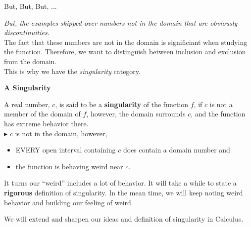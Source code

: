 \documentclass{ximera}
\begin{document}
\begin{observation} But, But, But, ...

\textit{But, the examples skipped over numbers not in the domain that are obviously discontinuities.}  \\

The fact that these numbers are not in the domain is significiant when studying the function.  Therefore, we want to distinguish between inclusion and exclusion from the domain. \\

This is why we have the \textit{singularity} category.
\end{observation}










\begin{idea} \textbf{\textcolor{green!50!black}{A Singularity}}  

A real number, $c$, is said to be a \textbf{singularity} of the function $f$, if $c$ is not a member of the domain of $f$, however, the domain surrounds $c$, and the function has extreme behavior there.  \\



$\blacktriangleright$  $c$ is not in the domain, however, 


\begin{itemize}
\item EVERY open interval containing $c$ does contain a domain number and 
\item the function is behaving weird near $c$. \\
\end{itemize}
It turns our ``weird'' includes a lot of behavior.  It will take a while to state a \textbf{\textcolor{purple!85!blue}{rigorous}} definition of singularity.  In the mean time, we will keep noting weird behavior and building our feeling of weird.


We will extend and sharpen our ideas and definition of singularity in Calculus.



\end{idea}
\end{document}
